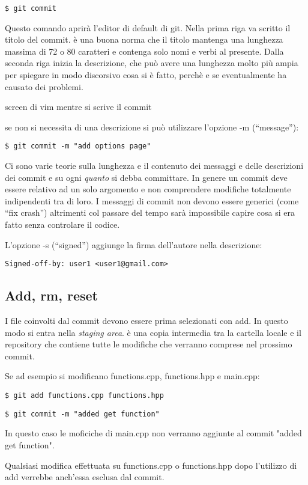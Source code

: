 \documentclass{article}
\begin{document}
\texttt{\$ git commit}

Questo comando aprirà l'editor di default di git. Nella prima riga va scritto il
titolo del commit. è una buona norma che il titolo mantenga una lunghezza
massima di 72 o 80 caratteri e contenga solo nomi e verbi al presente. Dalla
seconda riga inizia la descrizione, che può avere una lunghezza molto più ampia
per spiegare in modo discorsivo cosa si è fatto, perchè e se eventualmente ha
causato dei problemi.

screen di vim mentre si scrive il commit

se non si necessita di una descrizione si può utilizzare l'opzione -m
(``message''):

\texttt{\$ git commit -m "add options page"}

Ci sono varie teorie  sulla lunghezza e il contenuto dei messaggi e delle
descrizioni dei commit e su ogni \emph{quanto} si debba committare. In genere un
commit deve essere relativo ad un solo argomento e non comprendere modifiche
totalmente indipendenti tra di loro. I messaggi di commit non devono essere
generici (come ``fix crash'') altrimenti col passare del tempo sarà impossibile
capire cosa si era fatto senza controlare il codice.

L'opzione -s (``signed'') aggiunge la firma dell'autore nella descrizione:

\texttt{Signed-off-by: user1 <user1@gmail.com>}

\subsection{Add, rm, reset}

I file coinvolti dal commit devono essere prima selezionati con add. In questo
modo si entra nella \textit{staging area}. è una copia intermedia tra la
cartella locale e il repository che contiene tutte le modifiche che verranno
comprese nel prossimo commit.

Se ad esempio si modificano functions.cpp, functions.hpp e main.cpp:

\texttt{\$ git add functions.cpp functions.hpp}

\texttt{\$ git commit -m "added get function"}

In questo caso le moficiche di main.cpp non verranno aggiunte al commit "added
get function".

Qualsiasi modifica effettuata su functions.cpp o functions.hpp dopo l'utilizzo
di add verrebbe anch'essa esclusa dal commit.
\end{document}
